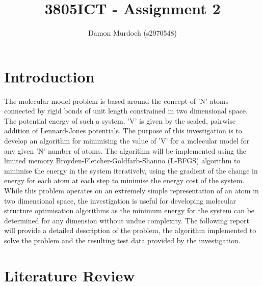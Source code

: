 \documentclass[9pt]{article}
\title{3805ICT - Assignment 2}
\author{Damon Murdoch (s2970548)}
\begin{document}
\maketitle

\section{Introduction}

The molecular model problem is based around the concept of 'N' atoms connected by rigid bonds of unit length constrained in two dimensional space. The potential energy of such a system, 'V' is given by the scaled, pairwise addition of Lennard-Jones potentials. The purpose of this investigation is to develop an algorithm for minimising the value of 'V' for a molecular model for any given 'N' number of atoms. The algorithm will be implemented using the limited memory Broyden-Fletcher-Goldfarb-Shanno (L-BFGS) algorithm to minimise the energy in the system iteratively, using the gradient of the change in energy for each atom at each step to minimise the energy cost of the system. While this problem operates on an extremely simple representation of an atom in two dimensional space, the investigation is useful for developing molecular structure optimisation algorithms as the minimum energy for the system can be determined for any dimension without undue complexity. The following report will provide a detailed description of the problem, the algorithm implemented to solve the problem and the resulting test data provided by the investigation.

\section{Literature Review}
\end{document}
